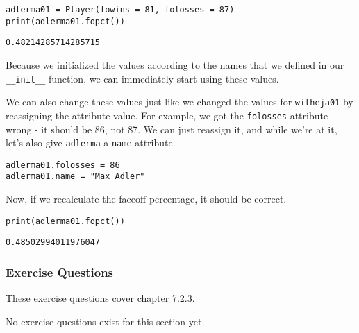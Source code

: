\begin{lstlisting}[style=pippython]
adlerma01 = Player(fowins = 81, folosses = 87)
print(adlerma01.fopct())
\end{lstlisting}
\begin{lstlisting}[style=none]
0.48214285714285715
\end{lstlisting}
Because we initialized the values according to the names that we defined in our \verb|__init__| function, we can immediately start using these values.\par
We can also change these values just like we changed the values for \verb|witheja01| by reassigning the attribute value. For example, we got the \verb|folosses| attribute wrong - it should be 86, not 87. We can just reassign it, and while we're at it, let's also give \verb|adlerma| a \verb|name| attribute.\par
\begin{lstlisting}[style=pippython]
adlerma01.folosses = 86
adlerma01.name = "Max Adler"
\end{lstlisting}
Now, if we recalculate the faceoff percentage, it should be correct.\par
\begin{lstlisting}[style=pippython]
print(adlerma01.fopct())
\end{lstlisting}
\begin{lstlisting}[style=none]
0.48502994011976047
\end{lstlisting}
\subsubsection*{Exercise Questions}
These exercise questions cover chapter 7.2.3.

No exercise questions exist for this section yet.
